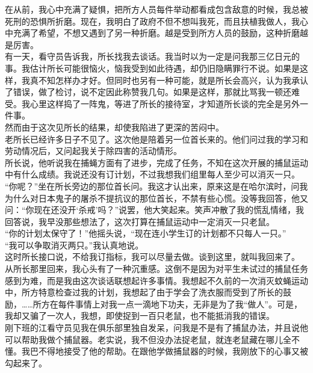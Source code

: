 在从前，我心中充满了疑惧，把所方人员每件举动都看成包含敌意的时候，我总被死刑的恐惧所折磨。现在，我明白了政府不但不想叫我死，而且扶植我做人，我心中充满了希望，不想又遇到了另一种折磨。越是受到所方人员的鼓励，这种折磨越是厉害。\\

有一天，看守员告诉我，所长找我去谈话。我当时以为一定是问我那三亿日元的事。我估计所长可能很恼火，恼我受到如此待遇，却仍旧隐瞒罪行不说。如果是这样，我真不知怎样办才好。但同时也另有一种可能，就是所长会高兴，认为我承认了错误，做了检讨，说不定因此称赞我几句。如果是这样，那就比骂我一顿还难受。我心里这样捣了一阵鬼，等进了所长的接待室，才知道所长谈的完全是另外一件事。\\

然而由于这次见所长的结果，却使我陷进了更深的苦闷中。\\

老所长已经许多日子不见了。这次他是陪着另一位首长来的。他们问过我的学习和劳动情况后，又问起我关于除四害的活动情形。\\

所长说，他听说我在捕蝇方面有了进步，完成了任务，不知在这次开展的捕鼠运动中有什么成绩。我说还没有订计划，不过我想我们组里每人至少可以消灭一只。\\

“你呢？”坐在所长旁边的那位首长问。我这才认出来，原来这是在哈尔滨时，问我为什么对日本鬼子的屠杀不提抗议的那位首长，不禁有些心慌。没等我回答，他又问：“你现在还没开‘杀戒’吗？”说罢，他大笑起来。笑声冲散了我的慌乱情绪，我回答说，我早没那些想法了，这次打算在捕鼠运动中一定消灭一只老鼠。\\

“你的计划太保守了！”他摇头说，“现在连小学生订的计划都不只每人一只。”\\

“我可以争取消灭两只。”我认真地说。\\

这时所长接口说，不给我订指标，我可以尽量去做。谈到这里，就叫我回来了。\\

从所长那里回来，我心头有了一种沉重感。这倒不是因为对平生未试过的捕鼠任务感到为难，而是我由这次谈话联想起许多事情。我想起不久前的一次消灭蚊蝇运动中，所方特意检查过我的计划，我想起了由于学会了洗衣服而受到了所长的鼓励，……所方在每件事情上对我一点一滴地下功夫，无非是为了我“做人”。可是，我却又骗了一次人，我想，即使捉到一百只老鼠，也不能抵消我的错误。\\

刚下班的江看守员见我在俱乐部里独自发呆，问我是不是有了捕鼠办法，并且说他可以帮助我做个捕鼠器。老实说，我不但没办法捉老鼠，就连老鼠藏在哪儿全不懂。我巴不得地接受了他的帮助。在跟他学做捕鼠器的时候，我刚放下的心事又被勾起来了。\\

